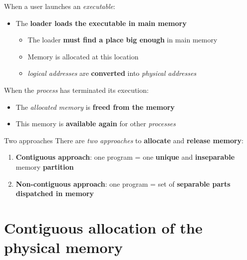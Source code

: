 \documentclass{beamer}[10pt, usepdftitle=false, handout]
\begin{document}
	\begin{frame}
	When a user launches an \textit{executable}:	
	\vspace*{0.5em}
	\begin{itemize}
	\item{The \textbf{loader loads the executable in main memory}
		\begin{itemize}
		\item{The loader \textbf{must find a place big enough} in main memory}
		\item{Memory is allocated at this location}
		\item{\textit{logical addresses} are \textbf{converted} into \textit{physical addresses}}
		\end{itemize}
	}
	\end{itemize}
	
	\pause	
	
	\vspace*{0.5em}	
	
	When the \textit{process} has terminated its execution:
	\vspace*{0.5em}
	\begin{itemize}
	\item{The \textit{allocated memory} is \textbf{freed from the memory}}
	\item{This memory is \textbf{available again} for other \textit{processes}}
	\end{itemize}			
		
	\vspace*{0.5em}		
		
	\begin{block}{Two approaches}
	There are \textit{two approaches} to \textbf{allocate} and \textbf{release memory}:
	\begin{enumerate}
	\item{\textbf{Contiguous approach}: one program = one \textbf{unique} and \textbf{inseparable} memory \textbf{partition}}
	\item{\textbf{Non-contiguous approach}:  one program = set of \textbf{separable parts dispatched in memory}}
	\end{enumerate}	
	\end{block}
		
	\end{frame}	    
	    	
	\section{Contiguous allocation of the physical memory}	    	
\end{document}
